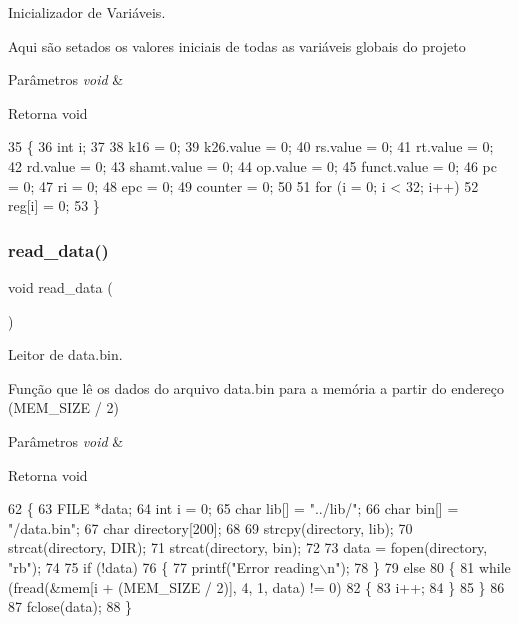 Inicializador de Variáveis. 

Aqui são setados os valores iniciais de todas as variáveis globais do projeto 
\begin{DoxyParams}{Parâmetros}
{\em void} & \\
\hline
\end{DoxyParams}
\begin{DoxyReturn}{Retorna}
void 
\end{DoxyReturn}

\begin{DoxyCode}
35 \{
36     \textcolor{keywordtype}{int} i;
37 
38     k16 = 0;
39     k26.value = 0;
40     rs.value = 0;
41     rt.value = 0;
42     rd.value = 0;
43     shamt.value = 0;
44     op.value = 0;
45     funct.value = 0;
46     pc = 0;
47     ri = 0;
48     epc = 0;
49     counter = 0;
50 
51     \textcolor{keywordflow}{for} (i = 0; i < 32; i++)
52         reg[i] = 0;
53 \}
\end{DoxyCode}
\mbox{\label{init_8h_abd335e5ea78a68ce84aaaed3bb02ff19}} 
\subsubsection{read\+\_\+data()}
{\footnotesize\ttfamily void read\+\_\+data (\begin{DoxyParamCaption}\item[{void}]{ }\end{DoxyParamCaption})}



Leitor de data.\+bin. 

Função que lê os dados do arquivo data.\+bin para a memória a partir do endereço (M\+E\+M\+\_\+\+S\+I\+ZE / 2) 
\begin{DoxyParams}{Parâmetros}
{\em void} & \\
\hline
\end{DoxyParams}
\begin{DoxyReturn}{Retorna}
void 
\end{DoxyReturn}

\begin{DoxyCode}
62 \{
63     FILE *data;
64     \textcolor{keywordtype}{int} i = 0;
65     \textcolor{keywordtype}{char} lib[] = \textcolor{stringliteral}{"../lib/"};
66     \textcolor{keywordtype}{char} bin[] = \textcolor{stringliteral}{"/data.bin"};
67     \textcolor{keywordtype}{char} directory[200];
68 
69     strcpy(directory, lib);
70     strcat(directory, DIR);
71     strcat(directory, bin);
72 
73     data = fopen(directory, \textcolor{stringliteral}{"rb"});
74 
75     \textcolor{keywordflow}{if} (!data)
76     \{
77         printf(\textcolor{stringliteral}{"Error reading\(\backslash\)n"});
78     \}
79     \textcolor{keywordflow}{else}
80     \{
81         \textcolor{keywordflow}{while} (fread(&mem[i + (MEM_SIZE / 2)], 4, 1, data) != 0)
82         \{
83             i++;
84         \}
85     \}
86 
87     fclose(data);
88 \}
\end{DoxyCode}
\mbox{\label{init_8h_ad88dca553e1e9f42d69c2443245dbcbe}} 
